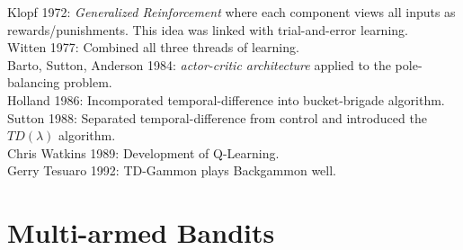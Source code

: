\documentclass[a4paper]{article}
\begin{document}
Klopf 1972: \textit{Generalized Reinforcement} where each component views all inputs as rewards/punishments. This idea was linked with trial-and-error learning.\\

Witten 1977: Combined all three threads of learning.\\

Barto, Sutton, Anderson 1984: \textit{actor-critic architecture} applied to the pole-balancing problem.\\

Holland 1986: Incomporated temporal-difference into bucket-brigade algorithm.\\

Sutton 1988: Separated temporal-difference from control and introduced the $TD(\lambda)$ algorithm.\\

Chris Watkins 1989: Development of Q-Learning.\\

Gerry Tesuaro 1992: TD-Gammon plays Backgammon well.\\

\section{Multi-armed Bandits}
\end{document}
